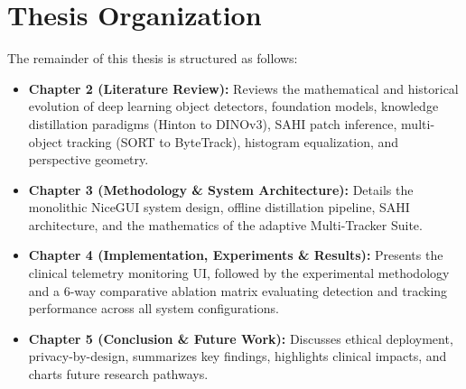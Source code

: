 \section{Thesis Organization}

The remainder of this thesis is structured as follows:

\begin{itemize}
    \item \textbf{Chapter 2 (Literature Review):} Reviews the mathematical and historical evolution of deep learning object detectors, foundation models, knowledge distillation paradigms (Hinton to DINOv3), SAHI patch inference, multi-object tracking (SORT to ByteTrack), histogram equalization, and perspective geometry.
    \item \textbf{Chapter 3 (Methodology \& System Architecture):} Details the monolithic NiceGUI system design, offline distillation pipeline, SAHI architecture, and the mathematics of the adaptive Multi-Tracker Suite.
    \item \textbf{Chapter 4 (Implementation, Experiments \& Results):} Presents the clinical telemetry monitoring UI, followed by the experimental methodology and a 6-way comparative ablation matrix evaluating detection and tracking performance across all system configurations.
    \item \textbf{Chapter 5 (Conclusion \& Future Work):} Discusses ethical deployment, privacy-by-design, summarizes key findings, highlights clinical impacts, and charts future research pathways.
\end{itemize}